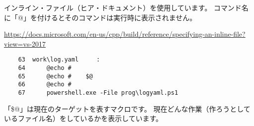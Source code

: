 \documentclass[dvipdfmx]{jsarticle}
\begin{document}
インライン・ファイル（ヒア・ドキュメント）を使用しています。
コマンド名に「@」を付けるとそのコマンドは実行時に表示されません。

\url{https://docs.microsoft.com/en-us/cpp/build/reference/specifying-an-inline-file?view=vs-2017}


\begin{verbatim}
    63	work\log.yaml     :
    64		@echo #
    65		@echo #    $@
    66		@echo #
    67		powershell.exe -File prog\logyaml.ps1
\end{verbatim}
「\$@」は現在のターゲットを表すマクロです。
現在どんな作業（作ろうとしているファイル名）をしているかを表示しています。

\begin{verbatim}
\end{verbatim}
\end{document}
